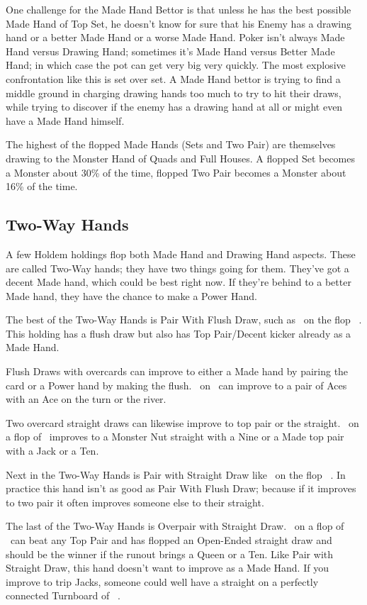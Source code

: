One challenge for the Made Hand Bettor is that unless he has the best
possible Made Hand of Top Set, he doesn't know for sure that his
Enemy has a drawing hand or a better Made Hand or a worse Made
Hand. Poker isn't always Made Hand versus Drawing Hand; sometimes it's
Made Hand versus Better Made Hand; in which case the pot can get very
big very quickly. The most explosive confrontation like this is set
over set. A Made Hand bettor is trying to find a middle ground in
charging drawing hands too much to try to hit their draws, while
trying to discover if the enemy has a drawing hand at all or might
even have a Made Hand himself.

The highest of the flopped Made Hands (Sets and Two Pair) are themselves
drawing to the Monster Hand of Quads and Full Houses. A flopped Set
becomes a Monster about 30\% of the time, flopped Two Pair becomes a
Monster about 16\% of the time.

\subsection{Two-Way Hands}

A few Holdem holdings flop both Made Hand and Drawing Hand aspects.
These are called Two-Way hands; they have two things going for them.
They've got a decent Made hand, which could be best right now.
If they're behind to a better Made hand, they have the chance to make
a Power Hand.

The best of the Two-Way Hands is Pair With Flush Draw, such as
\Kd\tend\ on the flop \Kc\nined\eigd\ . This holding has a flush
draw but also has Top Pair/Decent kicker already as a Made Hand.

Flush Draws with overcards can improve to either a Made hand by
pairing the card or a Power hand by making the flush. \Ad\sevd\ on
\Kc\nined\eigd\ can improve to a pair of Aces with an Ace on the turn
or the river.

Two overcard straight draws can likewise improve to top pair or the
straight. \Jh\tenc\ on a flop of \eigh\sevc\tres\ improves to a Monster
Nut straight with a Nine or a Made top pair with a Jack or a Ten.

Next in the Two-Way Hands is Pair with Straight Draw like
\tend\nined\ on the flop \tenc\eigh\sevs\ . In practice this hand
isn't as good as Pair With Flush Draw; because if it improves to two
pair it often improves someone else to their straight.

The last of the Two-Way Hands is Overpair with Straight
Draw. \Js\Jc\ on a flop of \tenc\nineh\eigs\ can beat any Top Pair
and has flopped an Open-Ended straight draw and should be the winner
if the runout brings a Queen or a Ten. Like Pair with Straight Draw,
this hand doesn't want to improve as a Made Hand. If you improve to
trip Jacks, someone could well have a straight on a perfectly
connected Turnboard of \tenc\nineh\eigs\Jh\ .

